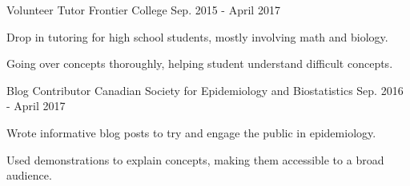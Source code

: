 \begin{cventries}
  \cventry
    {Volunteer Tutor} %
    {Frontier College}
    {} %
    {Sep. 2015 - April 2017} %
    {
      \begin{cvitems}
        \item{Drop in tutoring for high school students, mostly involving math and biology.}
        \item{Going over concepts thoroughly, helping student understand difficult concepts.}
      \end{cvitems}
    }
\end{cventries}
  \cventry
    {Blog Contributor} %
    {Canadian Society for Epidemiology and Biostatistics}
    {} %
    {Sep. 2016 - April 2017} %
    {
      \begin{cvitems}
        \item{Wrote informative blog posts to try and engage the public in epidemiology.}
        \item{Used demonstrations to explain concepts, making them accessible to a broad audience.}
      \end{cvitems}
    }
